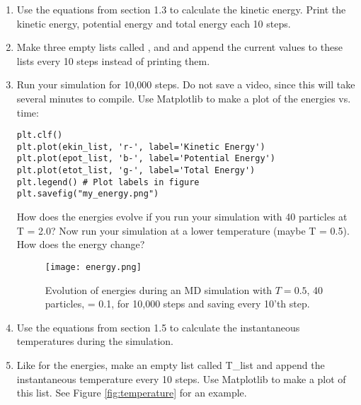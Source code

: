 \documentclass{article}
\begin{document}
\begin{enumerate}[resume]

    \item Use the equations from section 1.3 to calculate the kinetic energy.
        Print the kinetic energy, potential energy and total energy each 10 steps.

    \item Make three empty lists called ,  and  and append the current values to these lists every 10 steps instead of printing them.

    \item Run your simulation for 10,000 steps.
        Do not save a video, since this will take several minutes to compile.
        Use Matplotlib to make a plot of the energies vs. time:

\begin{lstlisting}
plt.clf()
plt.plot(ekin_list, 'r-', label='Kinetic Energy')
plt.plot(epot_list, 'b-', label='Potential Energy')
plt.plot(etot_list, 'g-', label='Total Energy')
plt.legend() # Plot labels in figure
plt.savefig("my_energy.png")
\end{lstlisting}

    How does the energies evolve if you run your simulation with 40 particles at T = 2.0?
    Now run your simulation at a lower temperature (maybe T = 0.5).
    How does the energy change?

    \begin{figure}[h!]
        \begin{center}
            \texttt{[image: energy.png]}
            \caption{
                Evolution of energies during an MD simulation with
                $T = 0.5$, 40 particles,  = 0.1, for 10,000 steps
                and saving every 10'th step.
            }
            \label{fig:energies}
        \end{center}
    \end{figure}


    \item Use the equations from section 1.5 to calculate the instantaneous
    temperatures during the simulation. 

    \item Like for the energies, make an empty list called T\_list and append the instantaneous temperature every 10 steps.
        Use Matplotlib to make a plot of this list. See Figure \ref{fig:temperature} for an example.


\end{enumerate}
\end{document}

